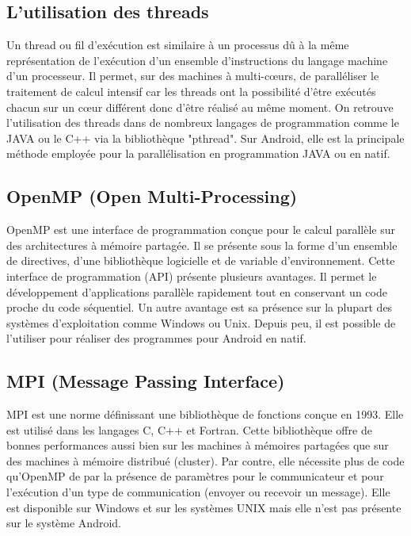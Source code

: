 \clearpage

\subsection{ L'utilisation des threads }

Un thread ou fil d'exécution est similaire à un processus dû à la même représentation de l'exécution d'un ensemble d'instructions du langage machine d'un processeur. Il permet, sur des machines à multi-cœurs, de paralléliser le traitement de calcul intensif car les threads ont la possibilité d'être exécutés chacun sur un cœur différent donc d'être réalisé au même moment. On retrouve l'utilisation des threads dans de nombreux langages de programmation comme le JAVA ou le C++ via la bibliothèque "pthread". Sur Android, elle est la principale méthode employée pour la parallélisation en programmation JAVA ou en natif. 

\subsection{ OpenMP (Open Multi-Processing) }

OpenMP est une interface de programmation conçue pour le calcul parallèle sur des architectures à mémoire partagée. Il se présente sous la forme d'un ensemble de directives, d'une bibliothèque logicielle et de variable d'environnement. Cette interface de programmation (API) présente plusieurs avantages. Il permet le développement d'applications parallèle rapidement tout en conservant un code proche du code séquentiel.
Un autre avantage est sa présence sur la plupart des systèmes d'exploitation comme Windows ou Unix. Depuis peu, il est possible de l'utiliser pour réaliser des programmes pour Android en natif.

\subsection{ MPI (Message Passing Interface) } 

MPI est une norme définissant une bibliothèque de fonctions conçue en 1993. Elle est utilisé dans les langages C, C++ et Fortran. Cette bibliothèque offre de bonnes performances aussi bien sur les machines à mémoires partagées que sur des machines à mémoire distribué (cluster). Par contre, elle nécessite plus de code qu'OpenMP de par la présence de paramètres pour le communicateur et pour l'exécution d'un type de communication (envoyer ou recevoir un message). Elle est disponible sur Windows et sur les systèmes UNIX mais elle n'est pas présente sur le système Android.


